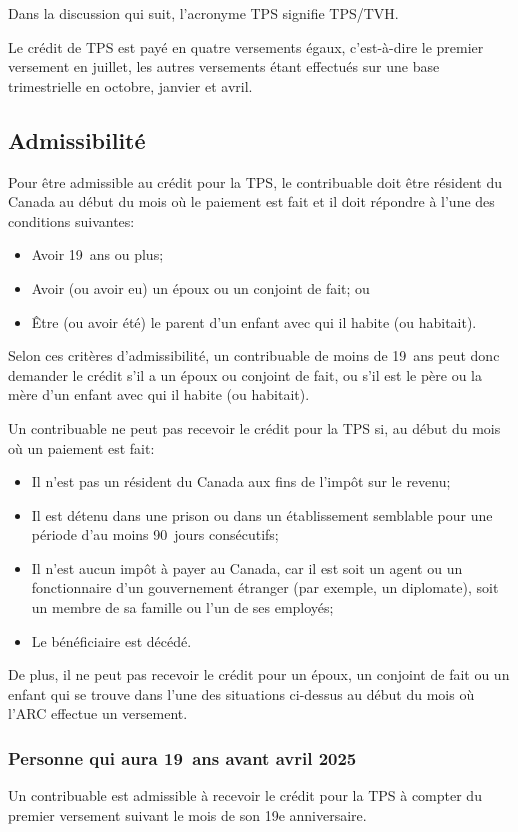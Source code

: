 Dans la discussion qui suit, l'acronyme TPS signifie TPS/TVH.

Le crédit de TPS est payé en quatre versements égaux, c'est-à-dire le premier versement en juillet, les autres versements étant effectués sur une base trimestrielle en octobre, janvier et avril.


\subsection{Admissibilité}
Pour être admissible au crédit pour la TPS, le contribuable doit être résident du Canada au début du mois où le paiement est fait et il doit répondre à l'une des conditions suivantes:
\begin{itemize}
	\item Avoir 19~ans ou plus;
	\item Avoir (ou avoir eu) un époux ou un conjoint de fait; ou
	\item Être (ou avoir été) le parent d'un enfant avec qui il habite (ou habitait).
\end{itemize}

Selon ces critères d'admissibilité, un contribuable de moins de 19~ans peut donc demander le crédit s'il a un époux ou conjoint de fait, ou s'il est le père ou la mère d'un enfant avec qui il habite (ou habitait).

Un contribuable ne peut pas recevoir le crédit pour la TPS si, au début du mois où un paiement est fait:
\begin{itemize}
	\item Il n'est pas un résident du Canada aux fins de l'impôt sur le revenu;
	\item Il est détenu dans une prison ou dans un établissement semblable pour une période d'au moins 90~jours consécutifs;
	\item Il n'est aucun impôt à payer au Canada, car il est soit un agent ou un fonctionnaire d'un gouvernement étranger (par exemple, un diplomate), soit un membre de sa famille ou l'un de ses employés;
	\item Le bénéficiaire est décédé.
\end{itemize}

De plus, il ne peut pas recevoir le crédit pour un époux, un conjoint de fait ou un enfant qui se trouve dans l'une des situations ci-dessus au début du mois où l'ARC effectue un versement.

\subsubsection{Personne qui aura 19~ans avant avril 2025}
Un contribuable est admissible à recevoir le crédit pour la TPS à compter du premier versement suivant le mois de son 19e anniversaire. 

